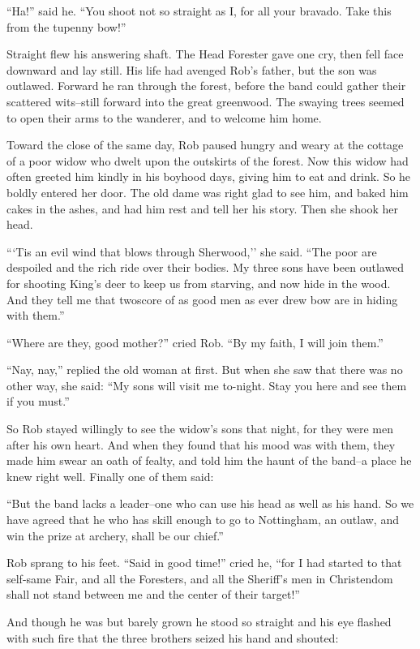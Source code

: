 ``Ha!'' said he. ``You shoot not so straight as I, for all your bravado.
Take this from the tupenny bow!''

Straight flew his answering shaft. The Head Forester gave one cry, then
fell face downward and lay still. His life had avenged Rob's father, but
the son was outlawed. Forward he ran through the forest, before the band
could gather their scattered wits--still forward into the great
greenwood. The swaying trees seemed to open their arms to the wanderer,
and to welcome him home.

Toward the close of the same day, Rob paused hungry and weary at the
cottage of a poor widow who dwelt upon the outskirts of the forest. Now
this widow had often greeted him kindly in his boyhood days, giving him
to eat and drink. So he boldly entered her door. The old dame was right
glad to see him, and baked him cakes in the ashes, and had him rest and
tell her his story. Then she shook her head.

```Tis an evil wind that blows through Sherwood,'' she said. ``The poor
are despoiled and the rich ride over their bodies. My three sons have
been outlawed for shooting King's deer to keep us from starving, and now
hide in the wood. And they tell me that twoscore of as good men as ever
drew bow are in hiding with them.''

``Where are they, good mother?'' cried Rob. ``By my faith, I will join
them.''

``Nay, nay,'' replied the old woman at first. But when she saw that
there was no other way, she said: ``My sons will visit me to-night. Stay
you here and see them if you must.''

So Rob stayed willingly to see the widow's sons that night, for they
were men after his own heart. And when they found that his mood was with
them, they made him swear an oath of fealty, and told him the haunt of
the band--a place he knew right well. Finally one of them said:

``But the band lacks a leader--one who can use his head as well as his
hand. So we have agreed that he who has skill enough to go to
Nottingham, an outlaw, and win the prize at archery, shall be our
chief.''

Rob sprang to his feet. ``Said in good time!'' cried he, ``for I had
started to that self-same Fair, and all the Foresters, and all the
Sheriff's men in Christendom shall not stand between me and the center
of their target!''

And though he was but barely grown he stood so straight and his eye
flashed with such fire that the three brothers seized his hand and
shouted:

